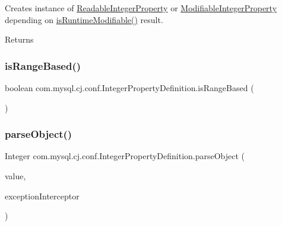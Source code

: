 Creates instance of \mbox{\hyperlink{classcom_1_1mysql_1_1cj_1_1conf_1_1_readable_integer_property}{Readable\+Integer\+Property}} or \mbox{\hyperlink{classcom_1_1mysql_1_1cj_1_1conf_1_1_modifiable_integer_property}{Modifiable\+Integer\+Property}} depending on \mbox{\hyperlink{classcom_1_1mysql_1_1cj_1_1conf_1_1_abstract_property_definition_a6c98140b2db84ccd0ff29ce165ec9ef5}{is\+Runtime\+Modifiable()}} result.

\begin{DoxyReturn}{Returns}

\end{DoxyReturn}
\mbox{\label{classcom_1_1mysql_1_1cj_1_1conf_1_1_integer_property_definition_ada0b35723ac1fe8089ecbbf357d30b1a}} 
\subsubsection{\texorpdfstring{is\+Range\+Based()}{isRangeBased()}}
{\footnotesize\ttfamily boolean com.\+mysql.\+cj.\+conf.\+Integer\+Property\+Definition.\+is\+Range\+Based (\begin{DoxyParamCaption}{ }\end{DoxyParamCaption})}

\mbox{\label{classcom_1_1mysql_1_1cj_1_1conf_1_1_integer_property_definition_a03819bef8deb0e4f6072d7ee1f9028d5}} 
\subsubsection{\texorpdfstring{parse\+Object()}{parseObject()}}
{\footnotesize\ttfamily Integer com.\+mysql.\+cj.\+conf.\+Integer\+Property\+Definition.\+parse\+Object (\begin{DoxyParamCaption}\item[{String}]{value,  }\item[{\mbox{\hyperlink{interfacecom_1_1mysql_1_1cj_1_1exceptions_1_1_exception_interceptor}{Exception\+Interceptor}}}]{exception\+Interceptor }\end{DoxyParamCaption})}



